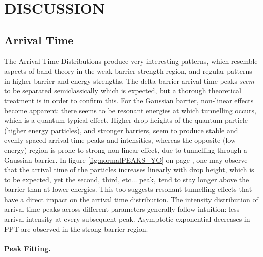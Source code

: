 \section{DISCUSSION}

\subsection{Arrival Time}

The Arrival Time Distributions produce very interesting patterns, which resemble aspects of band theory in the weak barrier strength region, and regular patterns in higher barrier and energy strengths. The delta barrier arrival time peaks \textit{seem} to be separated semiclassically which is expected, but a thorough theoretical treatment is in order to confirm this. For the Gaussian barrier, non-linear effects become apparent: there seems to be resonant energies at which tunnelling occurs, which is a quantum-typical effect. Higher drop heights of the quantum particle (higher energy particles), and stronger barriers, seem to produce stable and evenly spaced arrival time peaks and intensities, whereas the opposite  (low energy) region is prone to strong non-linear effect, due to tunnelling through a Gaussian barrier. In figure \ref{fig:normalPEAKS_YO} on page \pageref{fig:normalPEAKS_YO}, one may observe that the arrival time of the particles increases linearly with drop height, which is to be expected, yet the second, third, etc$\dots$ peak, tend to stay longer above the barrier than at lower energies. This too suggests resonant tunnelling effects that have a direct impact on the arrival time distribution. The intensity distribution of arrival time peaks across different parameters generally follow intuition: less arrival intensity at every subsequent peak. Asymptotic exponential decreases in PPT are observed in the strong barrier region.

\paragraph{Peak Fitting.}

